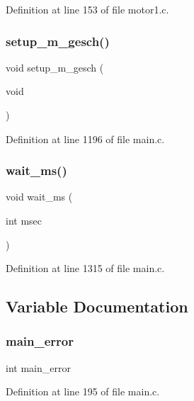 Definition at line 153 of file motor1.\+c.

\mbox{\label{befehl_8c_ac7688574b7282d8b949150e2aedf40cc}} 
\subsubsection{setup\+\_\+m\+\_\+gesch()}
{\footnotesize\ttfamily void setup\+\_\+m\+\_\+gesch (\begin{DoxyParamCaption}\item[{void}]{ }\end{DoxyParamCaption})}



Definition at line 1196 of file main.\+c.

\mbox{\label{befehl_8c_afad8aa90d3f050d853049cb8cd30a2db}} 
\subsubsection{wait\+\_\+ms()}
{\footnotesize\ttfamily void wait\+\_\+ms (\begin{DoxyParamCaption}\item[{int}]{msec }\end{DoxyParamCaption})}



Definition at line 1315 of file main.\+c.



\subsection{Variable Documentation}
\mbox{\label{befehl_8c_a7ffc28e9156b38574a5031086c1cbf0f}} 
\subsubsection{main\+\_\+error}
{\footnotesize\ttfamily int main\+\_\+error}



Definition at line 195 of file main.\+c.

\mbox{\label{befehl_8c_a4403857d84098dcee3088f476a2a2b34}} 
